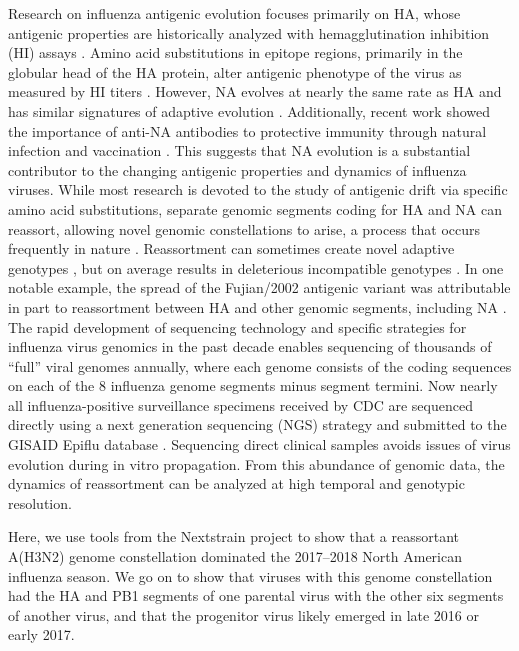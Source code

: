 Research on influenza antigenic evolution focuses primarily on HA, whose antigenic properties are historically analyzed with hemagglutination inhibition (HI) assays \citep{hirst_quantitative_1942}.
Amino acid substitutions in epitope regions, primarily in the globular head of the HA protein, alter antigenic phenotype of the virus as measured by HI titers \citep{smith_mapping_2004, koel_substitutions_2013, bedford_integrating_2014, neher_prediction_2016}.
However, NA evolves at nearly the same rate as HA and has similar signatures of adaptive evolution \citep{bhatt_genomic_2011}.
Additionally, recent work showed the importance of anti-NA antibodies to protective immunity through natural infection and vaccination \citep{monto_antibody_2015, huang_risk_2018}.
This suggests that NA evolution is a substantial contributor to the changing antigenic properties and dynamics of influenza viruses.
While most research is devoted to the study of antigenic drift via specific amino acid substitutions, separate genomic segments coding for HA and NA can reassort, allowing novel genomic constellations to arise, a process that occurs frequently in nature \citep{nelson_multiple_2008, marshall_influenza_2013}.
Reassortment can sometimes create novel adaptive genotypes \citep{neverov_intrasubtype_2014, dudas_reassortment_2015}, but on average results in deleterious incompatible genotypes \citep{rabadan_non-random_2008, villa_fitness_2017}.
In one notable example, the spread of the Fujian/2002 antigenic variant was attributable in part to reassortment between HA and other genomic segments, including NA \citep{holmes_whole_2005}.
The rapid development of sequencing technology and specific strategies for influenza virus genomics in the past decade enables sequencing of thousands of “full” viral genomes annually, where each genome consists of the coding sequences on each of the 8 influenza genome segments minus segment termini.
Now nearly all influenza-positive surveillance specimens received by CDC are sequenced directly using a next generation sequencing (NGS) strategy and submitted to the GISAID Epiflu database \citep{elbe2017data}.
Sequencing direct clinical samples avoids issues of virus evolution during in vitro propagation.
From this abundance of genomic data, the dynamics of reassortment can be analyzed at high temporal and genotypic resolution.

Here, we use tools from the Nextstrain project \citep{hadfield_nextstrain_2018} to show that a reassortant A(H3N2) genome constellation dominated the 2017–2018 North American influenza season.
We go on to show that viruses with this genome constellation had the HA and PB1 segments of one parental virus with the other six segments of another virus, and that the progenitor virus likely emerged in late 2016 or early 2017.


